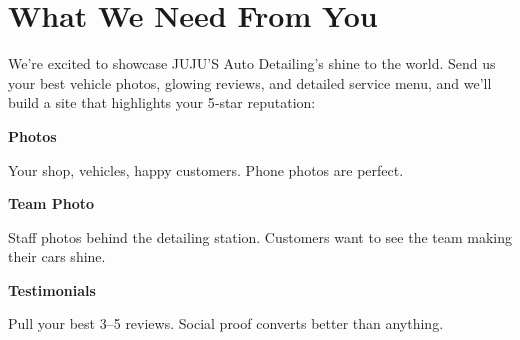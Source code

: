 \documentclass[11pt,letterpaper]{article}
\begin{document}
\vspace{0.2em}

\section*{What We Need From You}

We’re excited to showcase JUJU’S Auto Detailing’s shine to the world. Send us your best vehicle photos, glowing reviews, and detailed service menu, and we’ll build a site that highlights your 5‑star reputation:

\vspace{0.12em}

\noindent\begin{minipage}[t]{0.48\textwidth}
\begin{tcolorbox}[colframe=accent-teal, boxrule=1pt, left=0.7em, right=0.7em, top=0.5em, bottom=0.5em, arc=4pt, boxsep=0pt]
{\bfseries\small\color{accent-teal}Photos}

\vspace{0.15em}

{\small Your shop, vehicles, happy customers. Phone photos are perfect.}
\end{tcolorbox}

\vspace{0.1em}

\begin{tcolorbox}[colframe=accent-teal, boxrule=1pt, left=0.7em, right=0.7em, top=0.5em, bottom=0.5em, arc=4pt, boxsep=0pt]
{\bfseries\small\color{accent-teal}Team Photo}

\vspace{0.15em}

{\small Staff photos behind the detailing station. Customers want to see the team making their cars shine.}
\end{tcolorbox}

\vspace{0.1em}

\begin{tcolorbox}[colframe=accent-teal, boxrule=1pt, left=0.7em, right=0.7em, top=0.5em, bottom=0.5em, arc=4pt, boxsep=0pt]
{\bfseries\small\color{accent-teal}Testimonials}

\vspace{0.15em}

{\small Pull your best 3–5 reviews. Social proof converts better than anything.}
\end{tcolorbox}
\end{minipage}
\hfill
\end{document}

